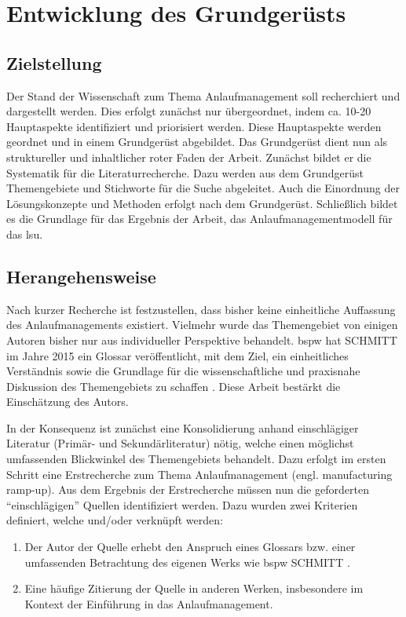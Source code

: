 \section{Entwicklung des Grundgerüsts}\label{sec:grundgeruest}
\subsection*{Zielstellung}

Der Stand der Wissenschaft zum Thema Anlaufmanagement soll recherchiert und dargestellt werden. Dies erfolgt zunächst nur übergeordnet, indem ca. 10-20 Hauptaspekte identifiziert und priorisiert werden. Diese Hauptaspekte werden geordnet und in einem Grundgerüst abgebildet. Das Grundgerüst dient nun als struktureller und inhaltlicher roter Faden der Arbeit. 
Zunächst bildet er die Systematik für die Literaturrecherche. Dazu werden aus dem Grundgerüst Themengebiete und Stichworte für die Suche abgeleitet. 
Auch die Einordnung der Lösungskonzepte und Methoden erfolgt nach dem Grundgerüst. %
Schließlich bildet es die Grundlage für das Ergebnis der Arbeit, das Anlaufmanagementmodell für das \gls{lsu}. %

\subsection*{Herangehensweise}

Nach kurzer Recherche ist festzustellen, dass bisher keine einheitliche Auffassung des Anlaufmanagements existiert. Vielmehr wurde das Themengebiet von einigen Autoren bisher nur aus individueller Perspektive behandelt. 
\Gls{bspw} hat SCHMITT im Jahre 2015 ein Glossar veröffentlicht, mit dem Ziel, ein einheitliches Verständnis sowie die Grundlage für die wissenschaftliche und praxisnahe Diskussion des Themengebiets zu schaffen \cite{Schmitt2015}. Diese Arbeit bestärkt die Einschätzung des Autors. %

In der Konsequenz ist zunächst eine Konsolidierung anhand einschlägiger Literatur (Primär- und Sekundärliteratur) nötig, welche einen möglichst umfassenden Blickwinkel des Themengebiets behandelt. Dazu erfolgt im ersten Schritt eine Erstrecherche zum Thema Anlaufmanagement (engl. manufacturing ramp-up). Aus dem Ergebnis der Erstrecherche müssen nun die geforderten ``einschlägigen'' Quellen identifiziert werden. Dazu wurden zwei Kriterien definiert, welche und/oder verknüpft werden: 
\begin{enumerate}
 \item Der Autor der Quelle erhebt den Anspruch eines Glossars bzw. einer umfassenden Betrachtung des eigenen Werks wie \gls{bspw} SCHMITT \cite{Schmitt2015}. %
 \item Eine häufige Zitierung der Quelle in anderen Werken, insbesondere im Kontext der Einführung in das Anlaufmanagement. %
\end{enumerate}

